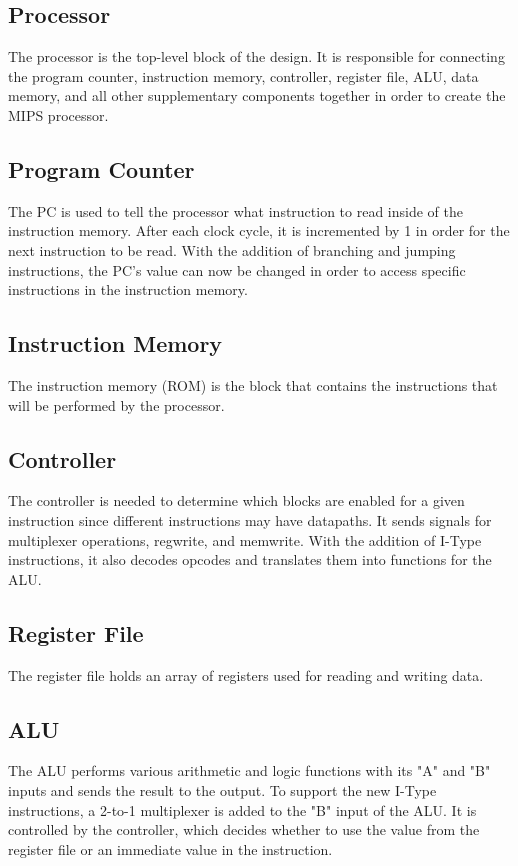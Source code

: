 \documentclass{article}
\begin{document}
	\subsection{Processor}
	The processor is the top-level block of the design. It is responsible for connecting the program counter, instruction memory, controller, register file, ALU, data memory, and all other supplementary components together in order to create the MIPS processor.  
	
	\subsection{Program Counter}
	The PC is used to tell the processor what instruction to read inside of the instruction memory. After each clock cycle, it is incremented by 1 in order for the next instruction to be read. With the addition of branching and jumping instructions, the PC's value can now be changed in order to access specific instructions in the instruction memory.
	
	\subsection{Instruction Memory}
	The instruction memory (ROM) is the block that contains the instructions that will be performed by the processor. 
	
  \subsection{Controller}
	The controller is needed to determine which blocks are enabled for a given instruction since different instructions may have datapaths. It sends signals for multiplexer operations, regwrite, and memwrite. With the addition of I-Type instructions, it also decodes opcodes and translates them into functions for the ALU. 
	
	\subsection{Register File}
	The register file holds an array of registers used for reading and writing data.
	
	\subsection{ALU}
	The ALU performs various arithmetic and logic functions with its "A" and "B" inputs and sends the result to the output. To support the new I-Type instructions, a 2-to-1 multiplexer is added to the "B" input of the ALU. It is controlled by the controller, which decides whether to use the value from the register file or an immediate value in the instruction.
	
\end{document}
